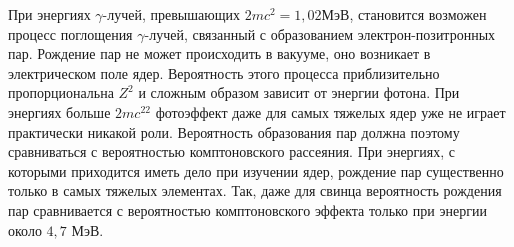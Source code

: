 При энергиях $\gamma$-лучей, превышающих $2mc^2 = 1,02$МэВ, становится
возможен процесс поглощения $\gamma$-лучей, связанный с образованием
электрон-позитронных пар. Рождение пар не может происходить в вакууме, оно
возникает в электрическом поле ядер. Вероятность этого процесса приблизительно
пропорциональна $Z^2$ и сложным образом зависит от энергии фотона. При
энергиях больше $2mc^22$ фотоэффект даже для самых тяжелых ядер уже не играет
практически никакой роли. Вероятность образования пар должна поэтому
сравниваться с вероятностью комптоновского рассеяния. При энергиях, с которыми
приходится иметь дело при изучении ядер, рождение пар существенно только в самых
тяжелых элементах. Так, даже для свинца вероятность рождения пар сравнивается с
вероятностью комптоновского эффекта только при энергии около $4,7$ МэВ.
